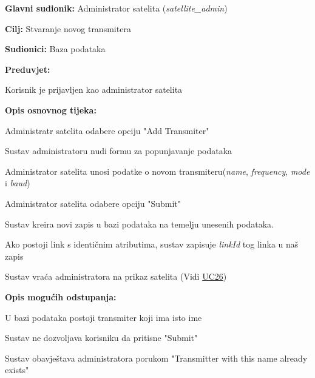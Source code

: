			\noindent {}
			\begin{packed_item}
				
				\item \textbf{Glavni sudionik: }Administrator satelita (\textit{satellite\_admin})
				\item  \textbf{Cilj: }Stvaranje novog transmitera
				\item  \textbf{Sudionici: }Baza podataka
				\item  \textbf{Preduvjet: }
				\begin{packed_enum}
					\item Korisnik je prijavljen kao administrator satelita	\end{packed_enum}
				\item  \textbf{Opis osnovnog tijeka: }
				
				\item[] \begin{packed_enum}
					\item Administratr satelita odabere opciju "Add Transmiter"
					\item Sustav administratoru nudi formu za popunjavanje podataka
					\item Administrator satelita unosi podatke o novom transmiteru(\textit{name}, \textit{frequency}, \textit{mode} i \textit{baud})
					\item Administrator satelita odabere opciju "Submit"
					\item Sustav kreira novi zapis u bazi podataka na temelju unesenih podataka.
					\item Ako postoji link s identičnim atributima, sustav zapisuje \textit{linkId}  tog linka u naš zapis
					\item Sustav vraća administratora na prikaz satelita (Vidi \hyperref[UC26]{  UC26})
					
				\end{packed_enum}
				
				\item  \textbf{Opis mogućih odstupanja: }
				
				\item[] \begin{packed_enum}
					
					\item[1] U bazi podataka postoji transmiter koji ima isto ime
					\item[ ] \begin{packed_enum}
						
						\item[1.1] Sustav ne dozvoljava korisniku da pritisne "Submit"
						\item[1.2] Sustav obavještava administratora porukom "Transmitter with this name already exists"
					\end{packed_enum}
				\end{packed_enum}
			\end{packed_item}
